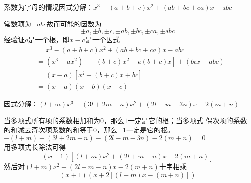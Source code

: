 \documentclass[windows,csize4]{BHCexam}
\begin{document}
\begin{groups}
\begin{questions}[]
        \question[5] 系数为字母的情况因式分解：$x^3-(a+b+c)x^2+(ab+bc+ca)x-abc$
        \begin{solution}{0.5cm}
            \methodonly 常数项为$-abc$故而可能的因数为
            \[\pm a, \pm b, \pm c, \pm ab, \pm bc, \pm ca, \pm abc \]
            经验证$a$是一个根，即$x-a$是一个因式
            \[
                \begin{aligned}
                     & \phantom{=} x^3-(a+b+c)x^2+(ab+bc+ca)x-abc \\
                     & =(x^3-ax^2)-[(b+c)x^2-a(b+c)x]+(bcx-abc)   \\
                     & =(x-a)[x^2-(b+c)x+bc]                      \\
                     & =(x-a)(x-b)(x-c)
                \end{aligned}
            \]
        \end{solution}
        \vspace{3.5cm}

        \question[5] 因式分解：$(l+m)x^3+(3l+2m-n)x^2+(2l-m-3n)x-2(m+n)$
        \begin{solution}{0.5cm}
            \methodonly 当多项式所有项的系数相加和为$0$，那么$1$一定是它的根；当多项式
            偶次项的系数的和减去奇次项系数的和等于$0$，那么$-1$一定是它的根。
            $-(l+m)+(3l+2m-n)-(2l-m-3n)-2(m+n)=0$ \\
            用多项式长除法可得
            \[
                (x+1)[(l+m)x^2+(2l+m-n)x-2(m+n)]
            \]
            然后对$(l+m)x^2+(2l+m-n)x-2(m+n)$十字相乘 \\
            \[
                (x+1)(x+2[(l+m)x-(m+n)])
            \]

        \end{solution}
        \vspace{3.5cm}

    \end{questions}
\end{groups}
\end{document}
